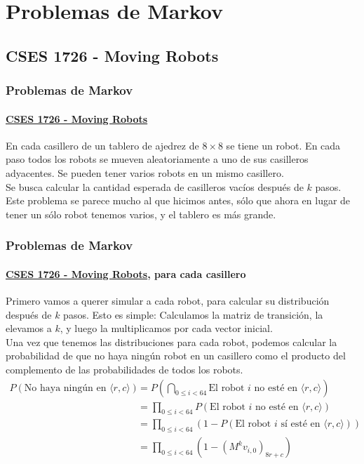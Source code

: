 \documentclass[../main.tex]{subfiles}
\begin{document}
\newcommand{\SECTIOND}{Problemas de Markov}
\section{\SECTIOND}

\newcommand{\EJD}{\href{https://cses.fi/problemset/view/1726/}{CSES 1726 - Moving Robots}}
\subsection{CSES 1726 - Moving Robots}

\begin{frame}
  \frametitle{\SECTIOND}
  \framesubtitle{\EJD}

  En cada casillero de un tablero de ajedrez de \(8 \times 8\) se tiene un robot. En cada paso todos los robots se mueven aleatoriamente a uno de sus casilleros adyacentes. Se pueden tener varios robots en un mismo casillero. \\
  Se busca calcular la cantidad esperada de casilleros vacíos después de \(k\) pasos. \pause \\
  Este problema se parece mucho al que hicimos antes, sólo que ahora en lugar de tener un sólo robot tenemos varios, y el tablero es más grande.
\end{frame}

\begin{frame}
  \frametitle{\SECTIOND}
  \framesubtitle{\EJD, para cada casillero}

  Primero vamos a querer simular a cada robot, para calcular su distribución después de \(k\) pasos. \pause Esto es simple: Calculamos la matriz de transición, la elevamos a \(k\), y luego la multiplicamos por cada vector inicial. \pause \\
  Una vez que tenemos las distribuciones para cada robot, podemos calcular la probabilidad de que no haya ningún robot en un casillero como el producto del complemento de las probabilidades de todos los robots. \pause
  \begin{align*}
    P(\text{No haya ningún en } \langle r, c \rangle) &= P(\bigcap_{0 \leq i < 64} \text{El robot } i \text{ no esté en } \langle r, c \rangle) \\
                                                      &= \prod_{0 \leq i < 64}P(\text{El robot } i \text{ no esté en } \langle r, c \rangle) \\
                                                      &= \prod_{0 \leq i < 64}(1 - P(\text{El robot } i \text{ sí esté en } \langle r, c \rangle)) \\
                                                      &= \prod_{0 \leq i < 64}(1 - (M^{k}v_{i,0})_{8r + c}) \\
  \end{align*}
\end{frame}
\end{document}

